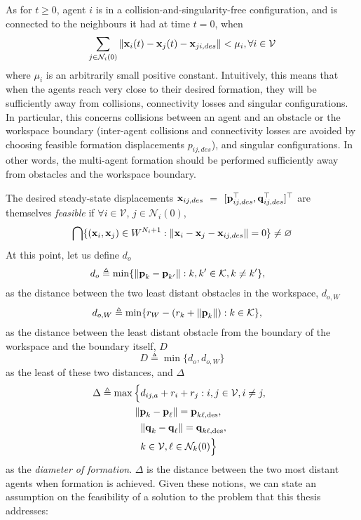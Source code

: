 As for $t \geq 0$, agent $i$ is in a collision-and-singularity-free
configuration, and is connected to the neighbours it had at time $t = 0$,
when
$$\sum_{j \in \mathcal{N}_i(0)} \| \bm{\mathbf{x}}_i(t) - \bm{\mathbf{x}}_j(t) - \bm{\mathbf{x}}_{ji,des}\| < \mu_i,
\forall i \in \mathcal{V}$$
where $\mu_i$ is an arbitrarily small positive constant. Intuitively, this
means that when the agents reach very close to their desired formation, they
will be sufficiently away from collisions, connectivity losses and singular
configurations. In particular, this concerns collisions between an agent and
an obstacle or the workspace boundary (inter-agent collisions and connectivity
losses are avoided by choosing feasible formation displacements $p_{ij,des}$),
and singular configurations. In other words, the multi-agent formation should be
performed sufficiently away from obstacles and the workspace boundary.

The desired steady-state displacements
$\bm{\mathbf{x}}_{ij,des}$ $=$ $[\bm{\mathbf{p}}_{ij,des}^{\top}, \bm{\mathbf{q}}_{ij,des}^{\top}]^{\top}$
are themselves \textit{feasible} if $\forall i \in \mathcal{V}$,
$j \in \mathcal{N}_i(0)$,
$$\bigcap \{(\bm{\mathbf{x}}_i, \bm{\mathbf{x}}_j) \in W^{N_i + 1} : \| \bm{\mathbf{x}}_i - \bm{\mathbf{x}}_j - \bm{\mathbf{x}}_{ij,des} \| = 0 \}
\ne \varnothing$$
At this point, let us define $d_o$
\begin{align*}
  d_o &\triangleq \min\{\| \bm{\mathbf{p}}_{k} - \bm{\mathbf{p}}_{k'}\| : k,k' \in \mathcal{K}, k \neq k' \},
\end{align*}
as the distance between the two least distant obstacles in the workspace,
$d_{o,W}$
\begin{align*}
  d_{o,W} & \triangleq \min\{r_W - \left( r_{k} + \| \bm{\mathbf{p}}_{k} \| \right) : k \in \mathcal{K}\},
\end{align*}
as the distance between the least distant obstacle from the boundary of the
workspace and the boundary itself, $D$
\begin{equation*}
  D \triangleq \min\{d_o, d_{o,W}\}
\end{equation*}
as the least of these two distances, and $\Delta$
\begin{align*}
  \hspace{-2mm} \Delta \triangleq \max\Big\{&d_{ij, a}+r_i+r_j: i, j \in \mathcal{V}, i \neq j, \notag \\
  &\hspace{-2mm} \| \vect{p}_k - \vect{p}_\ell \| = \vect{p}_{k \ell,\text{des}}, \\
  &\|\vect{q}_k - \vect{q}_\ell\| = \vect{q}_{k \ell,\text{des}}, \\
  &k \in \mathcal{V}, \ell \in \mathcal{N}_k(0)\Big\}
\end{align*}
as the \emph{diameter of formation}. $\Delta$ is the distance between the two
most distant agents when formation is achieved. Given these notions, we
can state an assumption on the feasibility of a solution to the problem
that this thesis addresses:


